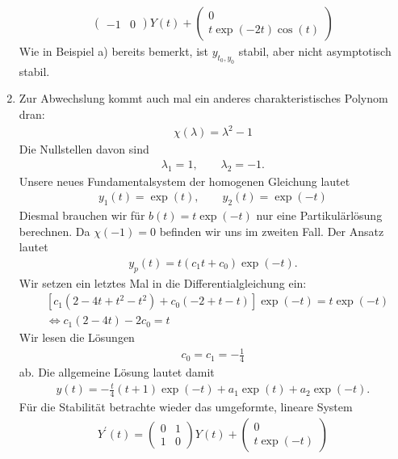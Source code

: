 \begin{solution}
\begin{enumerate}[label = \textbf{\alph*)}]
\begin{align*}
\begin{pmatrix}
      -1 & 0
    \end{pmatrix}Y(t)
    + \begin{pmatrix}
      0 \\ t\exp(-2t)\cos(t)
    \end{pmatrix}
  \end{align*}
  Wie in Beispiel a) bereits bemerkt, ist $y_{t_0,y_0}$ stabil, aber nicht asymptotisch stabil.
  \item Zur Abwechslung kommt auch mal ein anderes charakteristisches Polynom dran:
  \begin{align*}
    \chi(\lambda) = \lambda^2 - 1
  \end{align*}
  Die Nullstellen davon sind
  \begin{align*}
    \lambda_1 = 1, \qquad \lambda_2 = -1.
  \end{align*}
  Unsere neues Fundamentalsystem der homogenen Gleichung lautet
  \begin{align*}
    y_1(t) = \exp(t), \qquad y_2(t) = \exp(-t)
  \end{align*}
  Diesmal brauchen wir für $b(t) = t\exp(-t)$ nur eine Partikulärlösung berechnen.
  Da $\chi(-1) = 0$ befinden wir uns im zweiten Fall. Der Ansatz lautet
  \begin{align*}
    y_p(t) = t(c_1t + c_0)\exp(-t).
  \end{align*}
  Wir setzen ein letztes Mal in die Differentialgleichung ein:
  \begin{align*}
    &[c_1(2 - 4t + t^2 - t^2)+ c_0(-2 + t - t)]\exp(-t) = t\exp(-t) \\
    &\iff c_1(2 - 4t) - 2c_0 = t
  \end{align*}
  Wir lesen die Lösungen
  \begin{align*}
    c_0 = c_1 = -\frac{1}{4}
  \end{align*}
  ab. Die allgemeine Lösung lautet damit
  \begin{align*}
    y(t) = -\frac{t}{4}(t + 1)\exp(-t) + a_1\exp(t) + a_2\exp(-t).
  \end{align*}
  Für die Stabilität betrachte wieder das umgeformte, lineare System
  \begin{align*}
    Y^{\prime}(t) = \begin{pmatrix}
      0 & 1 \\
      1 & 0
    \end{pmatrix}Y(t)
    + \begin{pmatrix}
      0 \\ t\exp(-t)
    \end{pmatrix}

\end{align*}
\end{enumerate}
\end{solution}
